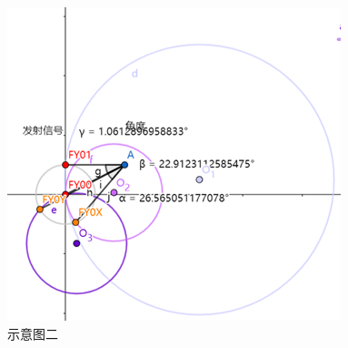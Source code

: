 \begin{figure}[h]
    \centering
    \includegraphics[scale=0.7]{res/figure111149.png}
    \caption{示意图二}
\end{figure}


